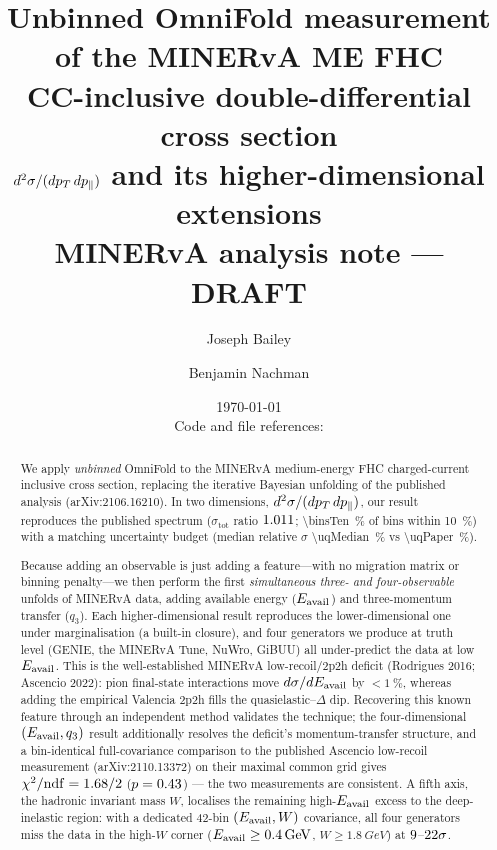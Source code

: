 \documentclass[11pt]{article}
\title{Unbinned OmniFold measurement of the MINERvA ME FHC\\
CC-inclusive double-differential cross section\\
$d^{2}\sigma/(dp_{T}\,dp_{\parallel})$ and its higher-dimensional extensions\\[4pt]
\large MINERvA analysis note --- DRAFT}
\author{Joseph Bailey \and Benjamin Nachman}
\date{\today\\[4pt]\small Code and file references: \repolink}
\begin{document}
\maketitle

\begin{abstract}
We apply \emph{unbinned} OmniFold to the MINERvA medium-energy FHC
charged-current inclusive cross section, replacing the iterative Bayesian
unfolding of the published analysis (arXiv:2106.16210). In two dimensions,
$d^{2}\sigma/(dp_{T}\,dp_{\parallel})$, our result reproduces the published spectrum
($\sigma_{\mathrm{tot}}$ ratio $1.011$; \SI{\binsTen}{\percent} of bins within
\SI{10}{\percent}) with a matching uncertainty budget (median relative $\sigma$
\SI{\uqMedian}{\percent} vs \SI{\uqPaper}{\percent}).

Because adding an observable is just adding a feature---with no migration matrix
or binning penalty---we then perform the first \emph{simultaneous three- and
four-observable} unfolds of MINERvA data, adding available energy ($E_{\mathrm{avail}}$)
and three-momentum transfer ($q_{3}$). Each higher-dimensional result reproduces
the lower-dimensional one under marginalisation (a built-in closure), and four
generators we produce at truth level (GENIE, the MINERvA Tune, NuWro, GiBUU) all
under-predict the data at low $E_{\mathrm{avail}}$. This is the well-established MINERvA
low-recoil/2p2h deficit (Rodrigues 2016; Ascencio 2022): pion final-state
interactions move $d\sigma/dE_{\mathrm{avail}}$ by $<\SI{1}{\percent}$, whereas adding the
empirical Valencia 2p2h fills the quasielastic--$\Delta$ dip. Recovering this
known feature through an independent method validates the technique; the
four-dimensional $(E_{\mathrm{avail}},q_{3})$ result additionally resolves the deficit's
momentum-transfer structure, and a bin-identical full-covariance comparison to
the published Ascencio low-recoil measurement (arXiv:2110.13372) on their
maximal common grid gives $\chi^{2}/\mathrm{ndf}=1.68/2$ ($p=0.43$) --- the
two measurements are consistent. A fifth axis, the hadronic
invariant mass $W$, localises the remaining high-$E_{\mathrm{avail}}$ excess to the
deep-inelastic region: with a dedicated 42-bin $(E_{\mathrm{avail}},W)$ covariance, all
four generators miss the data in the high-$W$ corner
($E_{\mathrm{avail}}\ge\SI{0.4}{GeV}$, $W\ge\SI{1.8}{GeV}$) at $9$--$22\sigma$.


\end{abstract}
\end{document}
